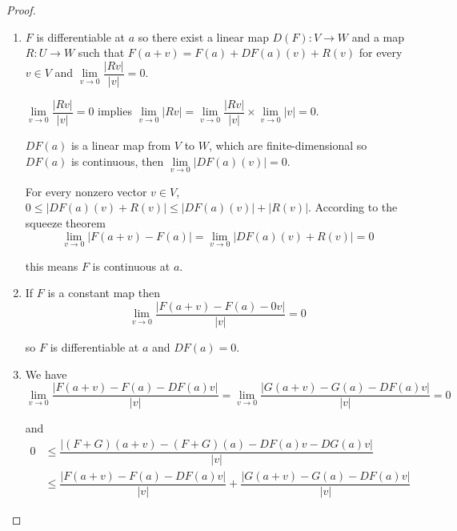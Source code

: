 \begin{proof}
    \begin{enumerate}[itemsep=0pt,label={(\alph*)}]
        \item \( F \) is differentiable at \( a \) so there exist a linear map \( D(F): V \to W \) and a map \( R: U \to W \) such that \( F(a + v) = F(a) + DF(a)(v) + R(v) \) for every \( v \in V \) and \( \lim\limits_{v\to 0} \dfrac{\left\vert Rv \right\vert}{\left\vert v \right\vert} = 0 \).

              \( \lim\limits_{v\to 0} \dfrac{\left\vert Rv \right\vert}{\left\vert v \right\vert} = 0 \) implies \( \lim\limits_{v\to 0} \left\vert Rv \right\vert = \lim\limits_{v\to 0} \dfrac{\left\vert Rv \right\vert}{\left\vert v \right\vert} \times \lim\limits_{v\to 0} \left\vert v \right\vert = 0 \).

              \( DF(a) \) is a linear map from \( V \) to \( W \), which are finite-dimensional so \( DF(a) \) is continuous, then \( \lim\limits_{v \to 0} \left\vert DF(a)(v) \right\vert = 0 \).

              For every nonzero vector \( v \in V \), \( 0 \le \left\vert DF(a)(v) + R(v) \right\vert \le \left\vert DF(a)(v) \right\vert +  \left\vert R(v) \right\vert \). According to the squeeze theorem
              \[
                  \lim\limits_{v \to 0} \left\vert F(a + v) - F(a) \right\vert = \lim\limits_{v \to 0} \left\vert DF(a)(v) + R(v) \right\vert = 0
              \]

              this means \( F \) is continuous at \( a \).
        \item If \( F \) is a constant map then
              \[
                  \lim\limits_{v \to 0} \dfrac{\left\vert F(a + v) - F(a) - 0v \right\vert}{\left\vert v \right\vert} = 0
              \]

              so \( F \) is differentiable at \( a \) and \( DF(a) = 0 \).
        \item We have
              \[
                  \lim\limits_{v\to 0} \dfrac{\left\vert F(a + v) - F(a) - DF(a)v \right\vert}{\left\vert v \right\vert} = \lim\limits_{v\to 0} \dfrac{\left\vert G(a + v) - G(a) - DF(a)v \right\vert}{\left\vert v \right\vert} = 0
              \]

              and
              \begingroup
              \allowdisplaybreaks%
              \begin{align*}
                  0 & \le \dfrac{\left\vert (F + G)(a + v) - (F + G)(a) - DF(a)v - DG(a)v \right\vert}{\left\vert v \right\vert}                                                                \\
                    & \le \dfrac{\left\vert F(a + v) - F(a) - DF(a)v \right\vert}{\left\vert v \right\vert} + \dfrac{\left\vert G(a + v) - G(a) - DF(a)v \right\vert}{\left\vert v \right\vert}
              \end{align*}
              \endgroup


\end{enumerate}
\end{proof}
